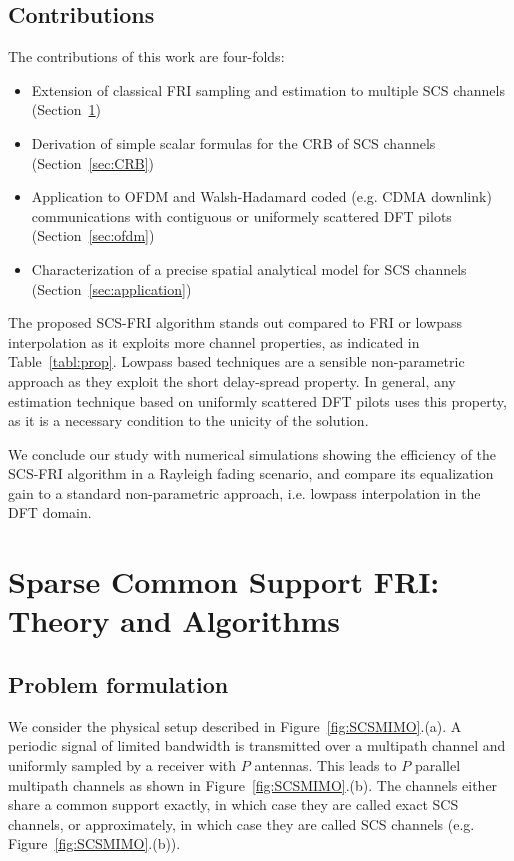 \documentclass[journal,10pt]{IEEEtran}
\begin{document}
\subsection{Contributions}
The contributions of this work are four-folds:
\begin{itemize}
\item Extension of classical FRI sampling and estimation to multiple SCS channels (Section~\ref{sec:theory})
\item Derivation of simple scalar formulas for the CRB of SCS channels (Section~\ref{sec:CRB})
\item Application to OFDM and Walsh-Hadamard coded (e.g. CDMA downlink) communications with contiguous or uniformely scattered DFT pilots (Section~\ref{sec:ofdm})
\item Characterization of a precise spatial analytical model for SCS channels (Section~\ref{sec:application})
\end{itemize}

The proposed SCS-FRI algorithm stands out compared to FRI or lowpass interpolation as it exploits more channel properties, as indicated in Table~\ref{tabl:prop}. Lowpass based techniques are a sensible non-parametric approach as they exploit the short delay-spread property. In general, any estimation technique based on uniformly scattered DFT pilots uses this property, as it is a necessary condition to the unicity of the solution.

We conclude our study with numerical simulations showing the efficiency of the SCS-FRI algorithm in a Rayleigh fading scenario, and compare its equalization gain to a standard non-parametric approach, i.e. lowpass interpolation in the DFT domain.




\section{Sparse Common Support FRI: Theory and Algorithms}\label{sec:theory}

\subsection{Problem formulation}
We consider the physical setup described in Figure~\ref{fig:SCSMIMO}.(a). A periodic signal of limited bandwidth is transmitted over a multipath channel and uniformly sampled by a receiver with $P$ antennas. This leads to $P$ parallel multipath channels as shown in Figure~\ref{fig:SCSMIMO}.(b). The channels either share a common support exactly, in which case they are called exact SCS channels, or approximately, in which case they are called SCS channels (e.g. Figure~\ref{fig:SCSMIMO}.(b)).
\end{document}

